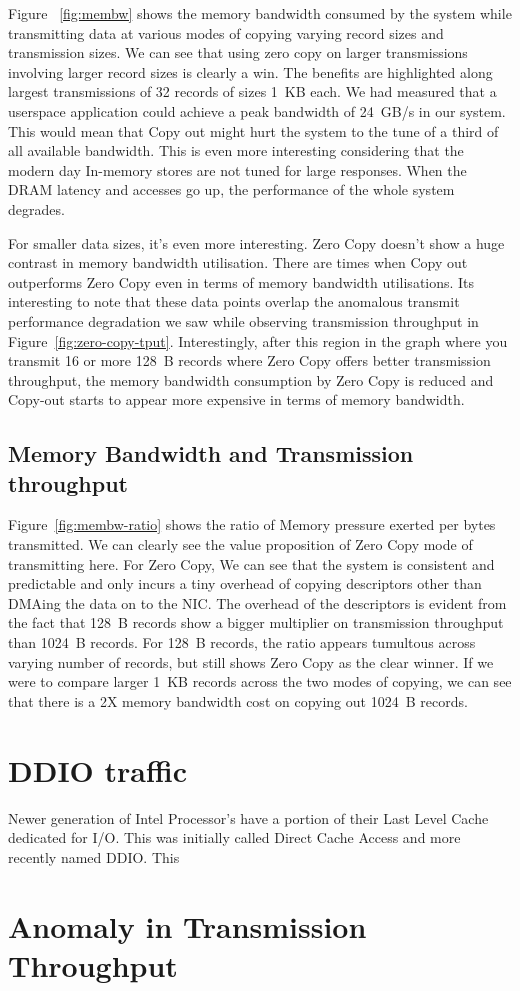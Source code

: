 

Figure ~\ref{fig:membw} shows the memory bandwidth consumed by the system while transmitting data at various modes 
of copying varying record sizes and transmission sizes. We can see that using zero copy on larger transmissions involving 
larger record sizes is clearly a win. The benefits are highlighted along largest transmissions of 32 records of sizes 1~KB each. 
 We had measured that a userspace application could achieve a peak bandwidth of 24~GB/s in our system. This would mean that Copy out 
 might hurt the system to the tune of a third of all available bandwidth. This is even more interesting considering that the modern day 
 In-memory stores are not tuned for large responses. When the DRAM latency and accesses go up, the performance of the whole system degrades.

For smaller data sizes, it's even more interesting. Zero Copy doesn't show a huge contrast in memory bandwidth utilisation. There are times 
when Copy out outperforms Zero Copy even in terms of memory bandwidth utilisations. Its interesting to note that these data points overlap the anomalous transmit performance 
degradation we saw while observing transmission throughput in Figure~\ref{fig:zero-copy-tput}. Interestingly, after this region in the graph 
where you transmit 16 or more 128~B records where Zero Copy offers better transmission throughput, the memory bandwidth consumption by Zero Copy 
is reduced and Copy-out starts to appear more expensive in terms of memory bandwidth. 

\subsection{Memory Bandwidth and Transmission throughput}

Figure~\ref{fig:membw-ratio} shows the ratio of Memory pressure exerted per bytes transmitted. We can clearly see the value proposition of 
Zero Copy mode of transmitting here. For Zero Copy, We can see that the system is consistent and predictable and only incurs a tiny overhead of 
copying descriptors other than DMAing the data on to the NIC. The overhead of the descriptors is evident from the fact that 128~B records show 
a bigger multiplier on transmission throughput than 1024~B records. For 128~B records, the ratio appears tumultous across varying number of records, 
 but still shows Zero Copy as the clear winner. If we were to compare larger 1~KB records across the two modes of copying, we can see that there is a 
 2X memory bandwidth cost on copying out 1024~B records.

\section{DDIO traffic}

Newer generation of Intel Processor's have a portion of their Last Level Cache dedicated for I/O. This was initially called Direct Cache Access\textregistered 
and more recently named DDIO\textregistered. This 

\section{Anomaly in Transmission Throughput}

